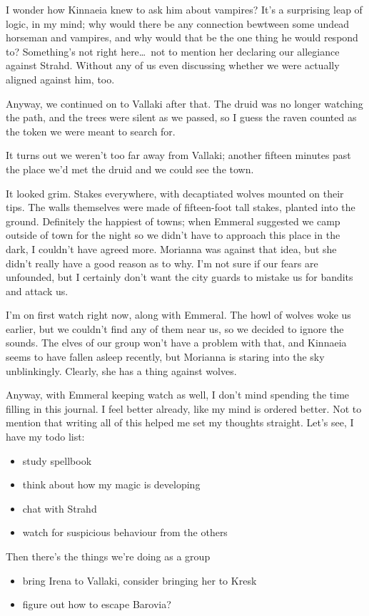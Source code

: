 I wonder how Kinnaeia knew to ask him about vampires? It's a surprising leap of logic, in my mind; why would there be any connection bewtween some undead horseman and vampires, and why would that be the one thing he would respond to? Something's not right here\dots\ not to mention her declaring our allegiance against Strahd. Without any of us even discussing whether we were actually aligned against him, too.

Anyway, we continued on to Vallaki after that. The druid was no longer watching the path, and the trees were silent as we passed, so I guess the raven counted as the token we were meant to search for.

It turns out we weren't too far away from Vallaki; another fifteen minutes past the place we'd met the druid and we could see the town.

It looked grim. Stakes everywhere, with decaptiated wolves mounted on their tips. The walls themselves were made of fifteen-foot tall stakes, planted into the ground. Definitely the happiest of towns; when Emmeral suggested we camp outside of town for the night so we didn't have to approach this place in the dark, I couldn't have agreed more. Morianna was against that idea, but she didn't really have a good reason as to why. I'm not sure if our fears are unfounded, but I certainly don't want the city guards to mistake us for bandits and attack us.

I'm on first watch right now, along with Emmeral. The howl of wolves woke us earlier, but we couldn't find any of them near us, so we decided to ignore the sounds. The elves of our group won't have a problem with that, and Kinnaeia seems to have fallen asleep recently, but Morianna is staring into the sky unblinkingly. Clearly, she has a thing against wolves.

Anyway, with Emmeral keeping watch as well, I don't mind spending the time filling in this journal. I feel better already, like my mind is ordered better. Not to mention that writing all of this helped me set my thoughts straight. Let's see, I have my todo list:
\begin{itemize}
\item study spellbook
\item think about how my magic is developing
\item chat with Strahd
\item watch for suspicious behaviour from the others
\end{itemize}

Then there's the things we're doing as a group
\begin{itemize}
\item bring Irena to Vallaki, consider bringing her to Kresk
\item figure out how to escape Barovia?
\end{itemize}

